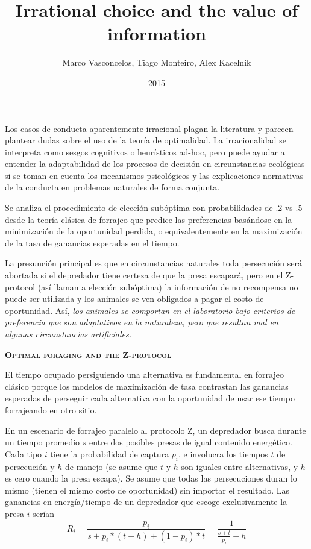 \documentclass[a4paper,12pt]{article}
\title{Irrational choice and the value of information}
\author{Marco Vasconcelos, Tiago Monteiro, Alex Kacelnik}
\date{2015}
\begin{document}
{\scshape\bfseries \maketitle}

Los casos de conducta aparentemente irracional plagan la literatura y parecen plantear dudas sobre el uso de la teoría de optimalidad. La irracionalidad se interpreta como sesgos cognitivos o heurísticos ad-hoc, pero puede ayudar a entender la adaptabilidad de los procesos de decisión en circunstancias ecológicas si se toman en cuenta los mecanismos psicológicos y las explicaciones normativas de la conducta en problemas naturales de forma conjunta.

Se analiza el procedimiento de elección subóptima con probabilidades de .2 vs .5 desde la teoría clásica de forrajeo que predice las preferencias basándose en la minimización de la oportunidad perdida, o equivalentemente en la maximización de la tasa de ganancias esperadas en el tiempo.

La presunción principal es que en circunstancias naturales toda persecución será abortada si el depredador tiene certeza de que la presa escapará, pero en el Z-protocol (así llaman a elección subóptima) la información de no recompensa no puede ser utilizada y los animales se ven obligados a pagar el costo de oportunidad. Así, {\itshape los animales se comportan en el laboratorio bajo criterios de preferencia que son adaptativos en la naturaleza, pero que resultan mal en algunas circunstancias artificiales.}

{\scshape\bfseries Optimal foraging and the Z-protocol}

El tiempo ocupado persiguiendo una alternativa es fundamental en forrajeo clásico porque los modelos de maximización de tasa contrastan las ganancias esperadas de perseguir cada alternativa con la oportunidad de usar ese tiempo forrajeando en otro sitio.

En un escenario de forrajeo paralelo al protocolo Z, un depredador busca durante un tiempo promedio $s$ entre dos posibles presas de igual contenido energético. Cada tipo $i$ tiene la probabilidad de captura $p_i$, e involucra los tiempos $t$ de persecución y $h$ de manejo (se asume que $t$ y $h$ son iguales entre alternativas, y $h$ es cero cuando la presa escapa). Se asume que todas las persecuciones duran lo mismo (tienen el mismo costo de oportunidad) sin importar el resultado. Las ganancias en energía/tiempo de un depredador que escoge exclusivamente la presa $i$ serían
\begin{equation}
R_i = \frac{p_i}{s+p_i*(t+h) + (1-p_i)*t} = \frac{1}{\frac{s+t}{p_i} + h}
\end{equation}
\end{document}
